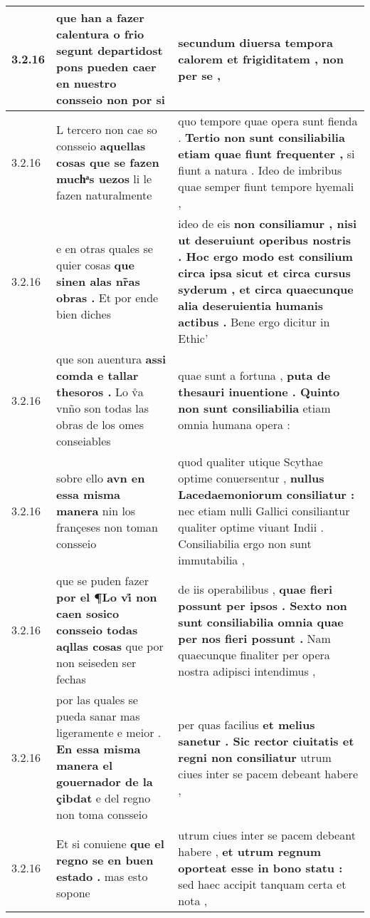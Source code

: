 \begin{tabular}{|p{1cm}|p{6.5cm}|p{6.5cm}|}
3.2.16 & que han a fazer calentura o frio \textbf{ segunt departidost pons pueden caer en nuestro consseio } non por si & secundum diuersa tempora calorem \textbf{ et frigiditatem , } non per se , \\\hline
3.2.16 & L tercero non cae so consseio \textbf{ aquellas cosas que se fazen muchͣs uezos } li le fazen naturalmente & quo tempore quae opera sunt fienda . \textbf{ Tertio non sunt consiliabilia etiam quae fiunt frequenter , } si fiunt a natura . Ideo de imbribus quae semper fiunt tempore hyemali , \\\hline
3.2.16 & e en otras quales se quier cosas \textbf{ que sinen alas nr̃as obras . } Et por ende bien diches & ideo de eis \textbf{ non consiliamur , nisi ut deseruiunt operibus nostris . Hoc ergo modo est consilium circa ipsa sicut et circa cursus syderum , et circa quaecunque alia deseruientia humanis actibus . } Bene ergo dicitur in Ethic’ \\\hline
3.2.16 & que son auentura \textbf{ assi comda e tallar thesoros . } Lo v̊a vnño son todas las obras de los omes conseiables & quae sunt a fortuna , \textbf{ puta de thesauri inuentione . Quinto non sunt consiliabilia } etiam omnia humana opera : \\\hline
3.2.16 & sobre ello \textbf{ avn en essa misma manera } nin los françeses non toman consseio & quod qualiter utique Scythae optime conuersentur , \textbf{ nullus Lacedaemoniorum consiliatur : } nec etiam nulli Gallici consiliantur qualiter optime viuant Indii . Consiliabilia ergo non sunt immutabilia , \\\hline
3.2.16 & que se puden fazer \textbf{ por el ¶Lo vi̊ non caen sosico consseio todas aqllas cosas } que por non seiseden ser fechas & de iis operabilibus , \textbf{ quae fieri possunt per ipsos . Sexto non sunt consiliabilia omnia quae per nos fieri possunt . } Nam quaecunque finaliter per opera nostra adipisci intendimus , \\\hline
3.2.16 & por las quales se pueda sanar mas ligeramente e meior . \textbf{ En essa misma manera el gouernador de la çibdat } e del regno non toma consseio & per quas facilius \textbf{ et melius sanetur . Sic rector ciuitatis et regni non consiliatur } utrum ciues inter se pacem debeant habere , \\\hline
3.2.16 & Et si conuiene \textbf{ que el regno se en buen estado . } mas esto sopone & utrum ciues inter se pacem debeant habere , \textbf{ et utrum regnum oporteat esse in bono statu : } sed haec accipit tanquam certa et nota , \\\hline

\end{tabular}
